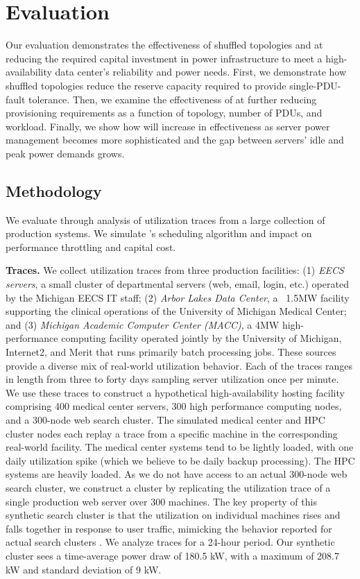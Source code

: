 \section{Evaluation}
\label{section::evaluation}

Our evaluation demonstrates the effectiveness of shuffled topologies and \PowerRouting at reducing the required capital investment in power infrastructure to meet a high-availability data center's reliability and power needs.  First, we demonstrate how shuffled topologies reduce the reserve capacity required to provide single-PDU-fault tolerance.  Then, we examine the effectiveness of \PowerRouting at further reducing provisioning requirements as a function of topology, number of PDUs, and workload.  Finally, we show how \PowerRouting will increase in effectiveness as server power management becomes more sophisticated and the gap between servers' idle and peak power demands grows.

\subsection{Methodology}
\label{section::methodology}

We evaluate \PowerRouting through analysis of utilization traces from a large collection of production systems. We simulate \PowerRouting's scheduling algorithm and impact on performance throttling and capital cost.

{\bf Traces.}
We collect utilization traces from three production facilities: (1) \emph{EECS servers}, a small cluster of departmental servers (web, email, login, etc.) operated by the Michigan EECS IT staff; (2) \emph{Arbor Lakes Data Center}, a ~1.5MW facility supporting the clinical operations of the University of Michigan Medical Center; and (3) \emph{Michigan Academic Computer Center (MACC)}, a 4MW high-performance computing facility operated jointly by the University of Michigan, Internet2, and Merit that runs primarily batch processing jobs.  These sources provide a diverse mix of real-world utilization behavior.  Each of the traces ranges in length from three to forty days sampling server utilization once per minute.  We use these traces to construct a hypothetical high-availability hosting facility  comprising 400 medical center servers, 300 high performance computing nodes, and a 300-node web search cluster.   The simulated medical center and HPC cluster nodes each replay a trace from a specific machine in the corresponding real-world facility.  The medical center systems tend to be lightly loaded, with one daily utilization spike (which we believe to be daily backup processing).  The HPC systems are heavily loaded.  As we do not have access to an actual 300-node web search cluster, we construct a cluster by replicating the utilization trace of a single production web server over 300 machines.  The key property of this synthetic search cluster is that the utilization on individual machines rises and falls together in response to user traffic, mimicking the behavior reported for actual search clusters \cite{Fan07}.  We analyze traces for a 24-hour period. Our synthetic cluster sees a time-average power draw of 180.5 kW, with a maximum of 208.7 kW and standard deviation of 9 kW.

